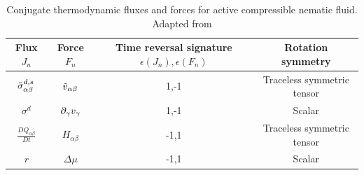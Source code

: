 \begin{table}[h]
    \centering
    \begin{tabular}{|c|c|c|c|}
        \hline
        Flux $J_n$ & Force $F_n$ & Time reversal signature $\epsilon(J_n), \epsilon(F_n)$ & Rotation symmetry\\
        \hline
        $\Tilde{\sigma}^{d,s}_{\alpha\beta}$ & $\Tilde{v}_{\alpha\beta}$ & 1,-1 & Traceless symmetric tensor\\
        $\sigma^d$ & $\inlinePartial{\gamma}{v_\gamma}$ & 1,-1 & Scalar\\
        $\frac{DQ_{\alpha\beta}}{Dt}$ & $H_{\alpha\beta}$ & -1,1 & Traceless symmetric tensor \\
        $r$ & $\Delta\mu$ & -1,1 & Scalar \\
        \hline
    \end{tabular}
    \caption{Conjugate thermodynamic fluxes and forces for active compressible nematic fluid. Adapted from \cite{julicher2018hydrodynamic}}
    \label{tab:nematicFluidFluxesForcesModelMN}
\end{table}

